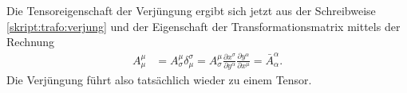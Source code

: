 Die Tensoreigenschaft der Verjüngung ergibt sich jetzt aus der Schreibweise
\eqref{skript:trafo:verjung}
und der Eigenschaft 
\label{label:trafo:t}
der Transformationsmatrix mittels der Rechnung
\begin{align*}
A^\mu_\mu
&=
A^\mu_\sigma
\delta^\sigma_\mu
=
A^\mu_\sigma
\frac{\partial x^\sigma}{\partial y^\alpha}
\frac{\partial y^\alpha}{\partial x^\mu}
=
\bar A^\alpha_\alpha.
\end{align*}
Die Verjüngung führt also tatsächlich wieder zu einem Tensor.

